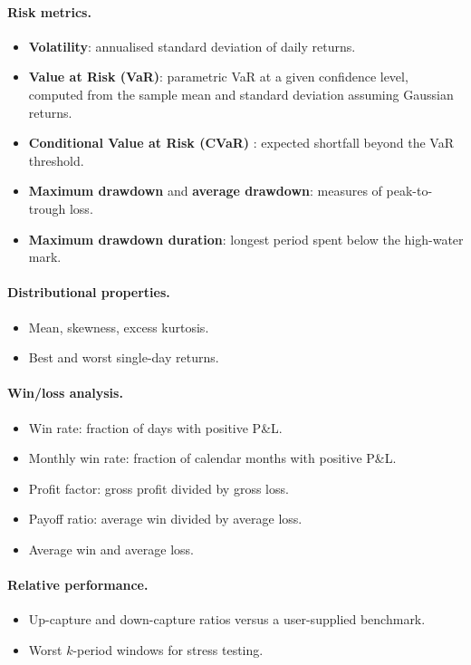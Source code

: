 \documentclass[11pt,a4paper]{article}
\begin{document}
\paragraph{Risk metrics.}
\begin{itemize}
  \item \textbf{Volatility}: annualised standard deviation of daily returns.
  \item \textbf{Value at Risk (VaR)}: parametric VaR at a given confidence
    level, computed from the sample mean and standard deviation assuming
    Gaussian returns.
  \item \textbf{Conditional Value at Risk (CVaR)} \citep{rockafellar2000}:
    expected shortfall beyond the VaR threshold.
  \item \textbf{Maximum drawdown} and \textbf{average drawdown}: measures
    of peak-to-trough loss.
  \item \textbf{Maximum drawdown duration}: longest period spent below the
    high-water mark.
\end{itemize}

\paragraph{Distributional properties.}
\begin{itemize}
  \item Mean, skewness, excess kurtosis.
  \item Best and worst single-day returns.
\end{itemize}

\paragraph{Win/loss analysis.}
\begin{itemize}
  \item Win rate: fraction of days with positive P\&L.
  \item Monthly win rate: fraction of calendar months with positive P\&L.
  \item Profit factor: gross profit divided by gross loss.
  \item Payoff ratio: average win divided by average loss.
  \item Average win and average loss.
\end{itemize}

\paragraph{Relative performance.}
\begin{itemize}
  \item Up-capture and down-capture ratios versus a user-supplied benchmark.
  \item Worst $k$-period windows for stress testing.
\end{itemize}
\end{document}
